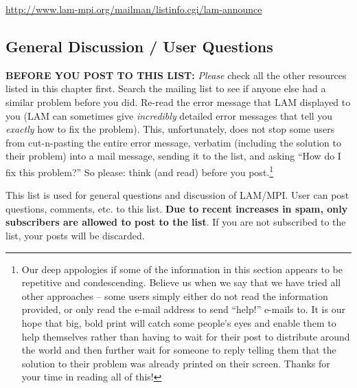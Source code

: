 \vspace{11pt}

\centerline{\url{http://www.lam-mpi.org/mailman/listinfo.cgi/lam-announce}}
  
\vspace{11pt}

  

\subsection{General Discussion / User Questions}
  
{\bf BEFORE YOU POST TO THIS LIST:} {\em Please} check all the other
resources listed in this chapter first.  Search the mailing list to
see if anyone else had a similar problem before you did.  Re-read the
error message that LAM displayed to you (LAM can sometimes give {\em
  incredibly} detailed error messages that tell you {\em exactly} how
to fix the problem).  This, unfortunately, does not stop some users
from cut-n-pasting the entire error message, verbatim (including the
solution to their problem) into a mail message, sending it to the
list, and asking ``How do I fix this problem?''  So please: think (and
read) before you post.\footnote{Our deep appologies if some of the
  information in this section appears to be repetitive and
  condescending.  Believe us when we say that we have tried all other
  approaches -- some users simply either do not read the information
  provided, or only read the e-mail address to send ``help!'' e-mails
  to.  It is our hope that big, bold print will catch some people's
  eyes and enable them to help themselves rather than having to wait
  for their post to distribute around the world and then further wait
  for someone to reply telling them that the solution to their problem
  was already printed on their screen.  Thanks for your time in
  reading all of this!}

\vspace{11pt}
  
This list is used for general questions and discussion of LAM/MPI.
User can post questions, comments, etc. to this list.  {\bf Due to
  recent increases in spam, only subscribers are allowed to post to
  the list}.  If you are not subscribed to the list, your posts will
be discarded.

